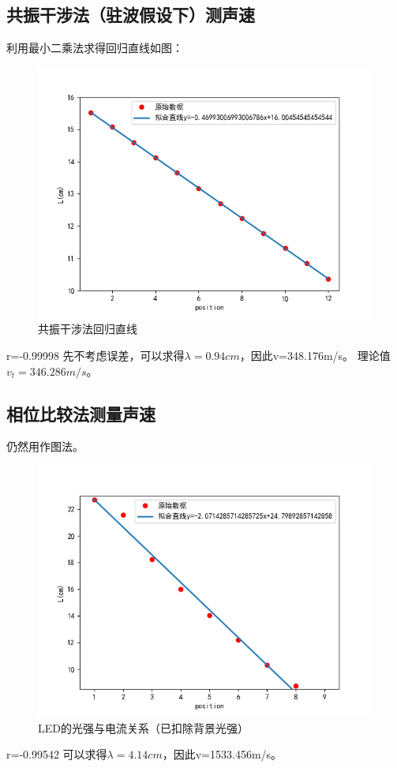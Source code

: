 \documentclass[UTF8]{ctexart}
\begin{document}
\subsection{共振干涉法（驻波假设下）测声速}
利用最小二乘法求得回归直线如图：
\begin{figure}[h]
    \centering
    \includegraphics[scale=1]{共振干涉法数据.png}
    \caption{共振干涉法回归直线}
\end{figure}
\newpage
r=-0.99998  
\newline
先不考虑误差，可以求得$\lambda=0.94cm$，因此v=348.176m/s。
\newline
理论值$v_t=346.286m/s$。
\subsection{相位比较法测量声速}
仍然用作图法。
\begin{figure}[h]
    \centering
    \includegraphics[scale=1]{相位法数据.png}
    \caption{LED的光强与电流关系（已扣除背景光强）}
\end{figure}
\newpage
r=-0.99542
\newline
可以求得$\lambda=4.14cm$，因此v=1533.456m/s。
\end{document}
